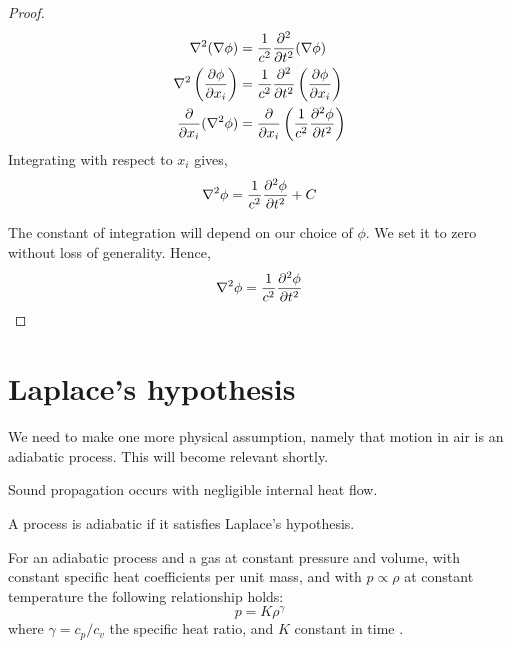     \begin{proof}
        \begin{align*}
            \nabla^2 (\nabla \phi)
            &= \frac{1}{c^2} \frac{\partial ^2}{\partial t^2} (\nabla \phi) \\
            \nabla^2 \left(\frac{\partial \phi}{\partial x_i}\right)
            &= \frac{1}{c^2} \frac{\partial ^2}{\partial t^2} \left(\frac{\partial \phi}{\partial x_i}\right) \\
            \frac{\partial }{\partial x_i} (\nabla^2 \phi )
            &= \frac{\partial }{\partial x_i} \left(\frac{1}{c^2} \frac{\partial ^2 \phi}{\partial t^2} \right)
        \end{align*}
    Integrating with respect to $x_i$ gives,
        \begin{equation*}
            \nabla^2 \phi = \frac{1}{c^2} \frac{\partial ^2 \phi}{\partial t^2} + C
        \end{equation*}\par
    The constant of integration will depend on our choice of $\phi$. We set it to zero without loss of generality. Hence,
        \begin{equation}\label{eq:lin_wave_phi}
            \nabla^2 \phi = \frac{1}{c^2} \frac{\partial ^2 \phi}{\partial t^2}
        \end{equation}
    \end{proof}
%
\section{Laplace's hypothesis}\label{ss:laplace_hypothesis}
We need to make one more physical assumption, namely that motion in air is an adiabatic process. This will become relevant shortly.
    \begin{hypothesis}
        Sound propagation occurs with negligible internal heat flow.
    \end{hypothesis}
    \begin{defn}\label{defn:adiabatic}
        A process is adiabatic if it satisfies Laplace's hypothesis.
    \end{defn} \par
%
For an adiabatic process and a gas at constant pressure and volume, with constant specific heat coefficients per unit mass, and with $p \propto \rho$ at constant temperature the following relationship holds:
    \begin{equation}\label{eq:adiabatic_condition}
        p = K \rho ^ \gamma
    \end{equation}
where $\gamma = c_p/c_v$ the specific heat ratio, and $K$ constant in time \cite[$\S$1.4.1]{pierce19acoustics}.
%
